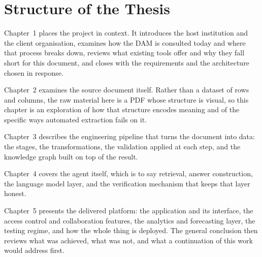 \section*{Structure of the Thesis}

Chapter~1 places the project in context. It introduces the host institution and the client organisation, examines how the DAM is consulted today and where that process breaks down, reviews what existing tools offer and why they fall short for this document, and closes with the requirements and the architecture chosen in response.

Chapter~2 examines the source document itself. Rather than a dataset of rows and columns, the raw material here is a PDF whose structure is visual, so this chapter is an exploration of how that structure encodes meaning and of the specific ways automated extraction fails on it.

Chapter~3 describes the engineering pipeline that turns the document into data: the stages, the transformations, the validation applied at each step, and the knowledge graph built on top of the result.

Chapter~4 covers the agent itself, which is to say retrieval, answer construction, the language model layer, and the verification mechanism that keeps that layer honest.

Chapter~5 presents the delivered platform: the application and its interface, the access control and collaboration features, the analytics and forecasting layer, the testing regime, and how the whole thing is deployed. The general conclusion then reviews what was achieved, what was not, and what a continuation of this work would address first.
